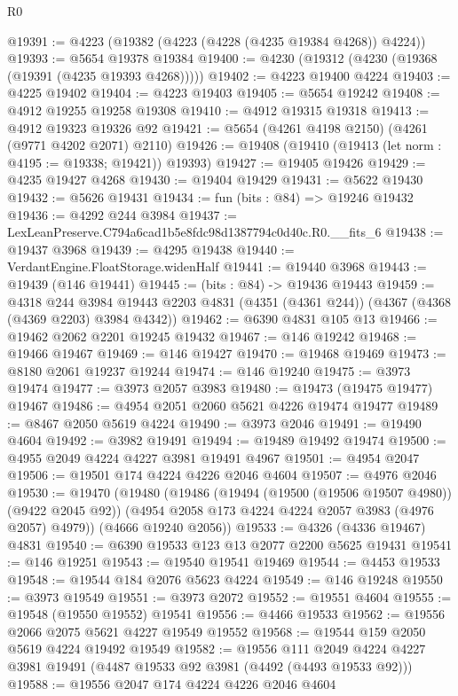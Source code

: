 \begin{lexlean}{R0}
\begin{coremodule}
@19391 := @4223 (@19382 (@4223 (@4228 (@4235 @19384 @4268)) @4224))
@19393 := @5654 @19378 @19384
@19400 := @4230 (@19312 (@4230 (@19368 (@19391 (@4235 @19393 @4268)))))
@19402 := @4223 @19400 @4224
@19403 := @4225 @19402
@19404 := @4223 @19403
@19405 := @5654 @19242
@19408 := @4912 @19255 @19258 @19308
@19410 := @4912 @19315 @19318
@19413 := @4912 @19323 @19326 @92
@19421 := @5654 (@4261 @4198 @2150) (@4261 (@9771 @4202 @2071) @2110)
@19426 := @19408 (@19410 (@19413 (let norm : @4195 := @19338; @19421)) @19393)
@19427 := @19405 @19426
@19429 := @4235 @19427 @4268
@19430 := @19404 @19429
@19431 := @5622 @19430
@19432 := @5626 @19431
@19434 := fun (bits : @84) => @19246 @19432
@19436 := @4292 @244 @3984
@19437 := LexLeanPreserve.C794a6cad1b5e8fdc98d1387794c0d40c.R0.__fits_6
@19438 := @19437 @3968
@19439 := @4295 @19438
@19440 := VerdantEngine.FloatStorage.widenHalf
@19441 := @19440 @3968
@19443 := @19439 (@146 @19441)
@19445 := (bits : @84) -> @19436 @19443
@19459 := @4318
    @244
    @3984
    @19443
    @2203
    @4831
    (@4351 (@4361 @244))
    (@4367 (@4368 (@4369 @2203) @3984 @4342))
@19462 := @6390 @4831 @105 @13
@19466 := @19462 @2062 @2201 @19245 @19432
@19467 := @146 @19242
@19468 := @19466 @19467
@19469 := @146 @19427
@19470 := @19468 @19469
@19473 := @8180 @2061 @19237 @19244
@19474 := @146 @19240
@19475 := @3973 @19474
@19477 := @3973 @2057 @3983
@19480 := @19473 (@19475 @19477) @19467
@19486 := @4954 @2051 @2060 @5621 @4226 @19474 @19477
@19489 := @8467 @2050 @5619 @4224
@19490 := @3973 @2046
@19491 := @19490 @4604
@19492 := @3982 @19491
@19494 := @19489 @19492 @19474
@19500 := @4955 @2049 @4224 @4227 @3981 @19491 @4967
@19501 := @4954 @2047
@19506 := @19501 @174 @4224 @4226 @2046 @4604
@19507 := @4976 @2046
@19530 := @19470
    (@19480
      (@19486
        (@19494 (@19500 (@19506 @19507 @4980)) (@9422 @2045 @92))
        (@4954 @2058 @173 @4224 @4224 @2057 @3983 (@4976 @2057) @4979))
      (@4666 @19240 @2056))
@19533 := @4326 (@4336 @19467) @4831
@19540 := @6390 @19533 @123 @13 @2077 @2200 @5625 @19431
@19541 := @146 @19251
@19543 := @19540 @19541 @19469
@19544 := @4453 @19533
@19548 := @19544 @184 @2076 @5623 @4224
@19549 := @146 @19248
@19550 := @3973 @19549
@19551 := @3973 @2072
@19552 := @19551 @4604
@19555 := @19548 (@19550 @19552) @19541
@19556 := @4466 @19533
@19562 := @19556 @2066 @2075 @5621 @4227 @19549 @19552
@19568 := @19544 @159 @2050 @5619 @4224 @19492 @19549
@19582 := @19556
    @111
    @2049
    @4224
    @4227
    @3981
    @19491
    (@4487 @19533 @92 @3981 (@4492 (@4493 @19533 @92)))
@19588 := @19556 @2047 @174 @4224 @4226 @2046 @4604

\end{coremodule}
\end{lexlean}
